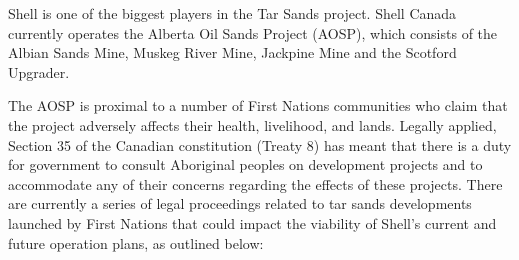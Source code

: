 Shell is one of the biggest players in the Tar Sands project. Shell Canada currently operates the Alberta Oil Sands Project (AOSP), which consists of the Albian Sands Mine, Muskeg River Mine, Jackpine Mine and the Scotford Upgrader. 



The AOSP is proximal to a number of First Nations communities who claim that the project adversely affects their health, livelihood, and lands.  Legally applied, Section 35 of the Canadian constitution (Treaty 8) has meant that there is a duty for government to consult Aboriginal peoples on development projects and to accommodate any of their concerns regarding the effects of these projects. There are currently a series of legal proceedings related to tar sands developments launched by First Nations that could impact the viability of Shell’s current and future operation plans, as outlined below:
